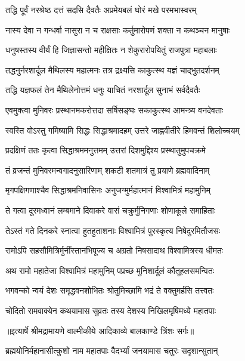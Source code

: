\twolineshloka
{तद्धि पूर्वं नरश्रेष्ठ दत्तं सदसि दैवतैः}
{अप्रमेयबलं घोरं मखे परमभास्वरम्} %

\twolineshloka
{नास्य देवा न गन्धर्वा नासुरा न च राक्षसाः}
{कर्तुमारोपणं शक्ता न कथञ्चन मानुषाः} %

\twolineshloka
{धनुषस्तस्य वीर्यं हि जिज्ञासन्तो महीक्षितः}
{न शेकुरारोपयितुं राजपुत्रा महाबलाः} %

\twolineshloka
{तद्धनुर्नरशार्दूल मैथिलस्य महात्मनः}
{तत्र द्रक्ष्यसि काकुत्स्थ यज्ञं चाद्भुतदर्शनम्} %

\twolineshloka
{तद्धि यज्ञफलं तेन मैथिलेनोत्तमं धनुः}
{याचितं नरशार्दूल सुनाभं सर्वदैवतैः} %

\twolineshloka
{एवमुक्त्वा मुनिवरः प्रस्थानमकरोत्तदा}
{सर्षिसङ्घः सकाकुत्स्थ आमन्त्र्य वनदेवताः} %

\twolineshloka
{स्वस्ति वोऽस्तु गमिष्यामि सिद्धः सिद्धाश्रमादहम्}
{उत्तरे जाह्नवीतीरे हिमवन्तं शिलोच्चयम्} %

\twolineshloka
{प्रदक्षिणं ततः कृत्वा सिद्धाश्रममनुत्तमम्}
{उत्तरां दिशमुद्दिश्य प्रस्थातुमुपचक्रमे} %

\twolineshloka
{तं व्रजन्तं मुनिवरमन्वगादनुसारिणाम्}
{शकटी शतमात्रं तु प्रयाणे ब्रह्मवादिनाम्} %

\twolineshloka
{मृगपक्षिगणाश्चैव सिद्धाश्रमनिवासिनः}
{अनुजग्मुर्महात्मानं विश्वामित्रं महामुनिम्} %

\twolineshloka
{ते गत्वा दूरमध्वानं लम्बमाने दिवाकरे}
{वासं चक्रुर्मुनिगणाः शोणाकूले समाहिताः} %

\twolineshloka
{तेऽस्तं गते दिनकरे स्नात्वा हुतहुताशनाः}
{विश्वामित्रं पुरस्कृत्य निषेदुरमितौजसः} %

\twolineshloka
{रामोऽपि सहसौमित्रिर्मुनींस्तानभिपूज्य च}
{अग्रतो निषसादाथ विश्वामित्रस्य धीमतः} %

\twolineshloka
{अथ रामो महातेजा विश्वामित्रं महामुनिम्}
{पप्रच्छ मुनिशार्दूलं कौतूहलसमन्वितः} %

\twolineshloka
{भगवन्को न्वयं देशः समृद्धवनशोभितः}
{श्रोतुमिच्छामि भद्रं ते वक्तुमर्हसि तत्त्वतः} %

\twolineshloka
{चोदितो रामवाक्येन कथयामास सुव्रतः}
{तस्य देशस्य निखिलमृषिमध्ये महातपाः} %


{॥इत्यार्षे श्रीमद्रामायणे वाल्मीकीये आदिकाव्ये बालकाण्डे त्रिंशः सर्गः॥}


\twolineshloka
{ब्रह्मयोनिर्महानासीत्कुशो नाम महातपाः}
{वैदर्भ्यां जनयामास चतुरः सदृशान्सुतान्} %

